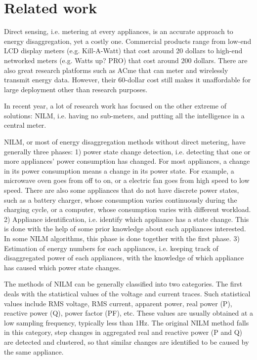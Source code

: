 \chapter{Related work}\label{chap2}

Direct sensing, i.e. metering at every appliances, is an accurate approach to energy disaggregation, yet a costly one. Commercial products range from low-end LCD display meters (e.g. Kill-A-Watt) that cost around 20 dollars to high-end networked meters (e.g. Watts up? PRO) that cost around 200 dollars. There are also great research platforms such as ACme\cite{Jiang2009} that can meter and wirelessly transmit energy data. However, their 60-dollar cost still makes it unaffordable for large deployment other than research purposes. 

In recent year, a lot of research work has focused on the other extreme of solutions: NILM, i.e. having no sub-meters, and putting all the intelligence in a central meter. 

NILM, or most of energy disaggregation methods without direct metering, have generally three phases: 1) power state change detection, i.e. detecting that one or more appliances' power consumption has changed. For most appliances, a change in its power consumption means a change in its power state. For example, a microwave oven goes from off to on, or a electric fan goes from high speed to low speed. There are also some appliances that do not have discrete power states, such as a battery charger, whose consumption varies continuously during the charging cycle, or a computer, whose consumption varies with different workload. 2) Appliance identification, i.e. identify which appliance has a state change. This is done with the help of some prior knowledge about each appliances interested. In some NILM algorithms, this phase is done together with the first phase. 3) Estimation of energy numbers for each appliances, i.e. keeping track of disaggregated power of each appliances, with the knowledge of which appliance has caused which power state changes.

The methods of NILM can be generally classified into two categories. The first deals with the statistical values of the voltage and current traces. Such statistical values include RMS voltage, RMS current, apparent power, real power (P), reactive power (Q), power factor (PF), etc. These values are usually obtained at a low sampling frequency, typically less than 1Hz. 
The original NILM method\cite{Hart1992} falls in this category, step changes in aggregated real and reactive power (P and Q) are detected and clustered, so that similar changes are identified to be caused by the same appliance. 